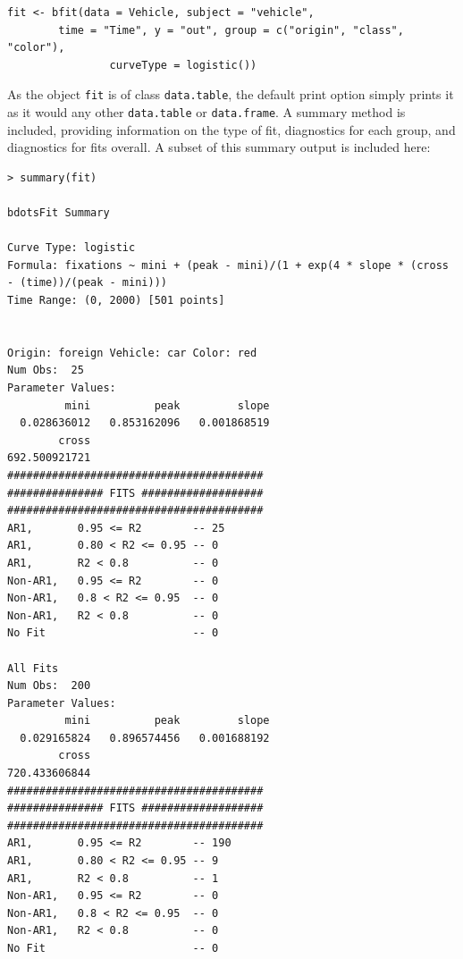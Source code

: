 \documentclass{article}
\newcommand{\xt}{\texttt}%
\begin{document}
\begin{singlespace}
\begin{center}
\begin{verbatim}
fit <- bfit(data = Vehicle, subject = "vehicle", 
	 	time = "Time", y = "out", group = c("origin", "class", "color"),
	 			curveType = logistic())
\end{verbatim}
\end{center}
\end{singlespace}

As the object \xt{fit} is of class \xt{data.table}, the default print option simply prints it as it would any other \xt{data.table} or \xt{data.frame}. A summary method is included, providing information on the type of fit, diagnostics for each group, and diagnostics for fits overall. A subset of this summary output is included here:

\begin{singlespace}
\begin{verbatim}
> summary(fit)

bdotsFit Summary

Curve Type: logistic 
Formula: fixations ~ mini + (peak - mini)/(1 + exp(4 * slope * (cross - (time))/(peak - mini))) 
Time Range: (0, 2000) [501 points]


Origin: foreign Vehicle: car Color: red 
Num Obs:  25 
Parameter Values: 
         mini          peak         slope 
  0.028636012   0.853162096   0.001868519 
        cross 
692.500921721 
########################################
############### FITS ###################
########################################
AR1,       0.95 <= R2        -- 25 
AR1,       0.80 < R2 <= 0.95 -- 0 
AR1,       R2 < 0.8          -- 0 
Non-AR1,   0.95 <= R2        -- 0 
Non-AR1,   0.8 < R2 <= 0.95  -- 0 
Non-AR1,   R2 < 0.8          -- 0 
No Fit                       -- 0 

All Fits 
Num Obs:  200 
Parameter Values: 
         mini          peak         slope 
  0.029165824   0.896574456   0.001688192 
        cross 
720.433606844 
########################################
############### FITS ###################
########################################
AR1,       0.95 <= R2        -- 190 
AR1,       0.80 < R2 <= 0.95 -- 9 
AR1,       R2 < 0.8          -- 1 
Non-AR1,   0.95 <= R2        -- 0 
Non-AR1,   0.8 < R2 <= 0.95  -- 0 
Non-AR1,   R2 < 0.8          -- 0 
No Fit                       -- 0 
\end{verbatim}
\end{singlespace}
\end{document}
